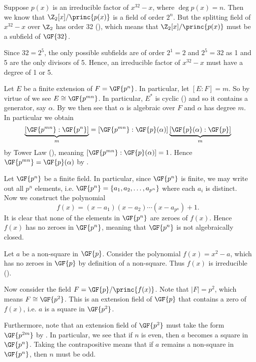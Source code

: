 \begin{questions}
    \item Suppose $p(x)$ is an irreducible factor of $x^{32} - x$, where $\deg p(x) = n$. Then we know that $\Z_2[x]/\princ{p(x)}$ is a field of order $2^n$. But the splitting field of $x^{32} - x$ over $\Z_2$ has order 32 (), which means that $\Z_2[x]/\princ{p(x)}$ must be a subfield of $\GF{32}$.

    Since $32 = 2^5$, the only possible subfields are of order $2^1 = 2$ and $2^5 = 32$ as 1 and 5 are the only divisors of 5. Hence, an irreducible factor of $x^{32} - x$ must have a degree of 1 or 5.

    \item Let $E$ be a finite extension of $F = \GF{p^n}$. In particular, let $[E:F] = m$. So by virtue of  we see $E \cong \GF{p^{mn}}$. In particular, $E^\ast$ is cyclic () and so it contains a generator, say $\alpha$. By  we then see that $\alpha$ is algebraic over $F$ and $\alpha$ has degree $m$. In particular we obtain
    \[
        \underbrace{[\GF{p^{mn}}:\GF{p^n}]}_m = [\GF{p^{mn}}:\GF{p}(\alpha)]\underbrace{[\GF{p}(\alpha):\GF{p}]}_{m}
    \]
    by Tower Law (), meaning $[\GF{p^{mn}}:\GF{p}(\alpha)] = 1$. Hence $\GF{p^{mn}} = \GF{p}(\alpha)$ by .

    \item Let $\GF{p^n}$ be a finite field. In particular, since $\GF{p^n}$ is finite, we may write out all $p^n$ elements, i.e. $\GF{p^n} = \{a_1, a_2, \dots, a_{p^n}\}$ where each $a_i$ is distinct. Now we construct the polynomial
    \[
        f(x) = (x-a_1)(x-a_2)\cdots(x-a_{p^n}) + 1.
    \]
    It is clear that none of the elements in $\GF{p^n}$ are zeroes of $f(x)$. Hence $f(x)$ has no zeroes in $\GF{p^n}$, meaning that $\GF{p^n}$ is not algebraically closed.

    \item Let $a$ be a non-square in $\GF{p}$. Consider the polynomial $f(x) = x^2 - a$, which has no zeroes in $\GF{p}$ by definition of a non-square. Thus $f(x)$ is irreducible ().

    Now consider the field $F = \GF{p}/\princ{f(x)}$. Note that $|F| = p^2$, which means $F \cong \GF{p^2}$. This is an extension field of $\GF{p}$ that contains a zero of $f(x)$, i.e. $a$ is a square in $\GF{p^2}$.

    Furthermore, note that an extension field of $\GF{p^2}$ must take the form $\GF{p^{2m}}$ by . In particular, we see that if $n$ is even, then $a$ becomes a square in $\GF{p^n}$. Taking the contrapositive means that if $a$ remains a non-square in $\GF{p^n}$, then $n$ must be odd.
\end{questions}
